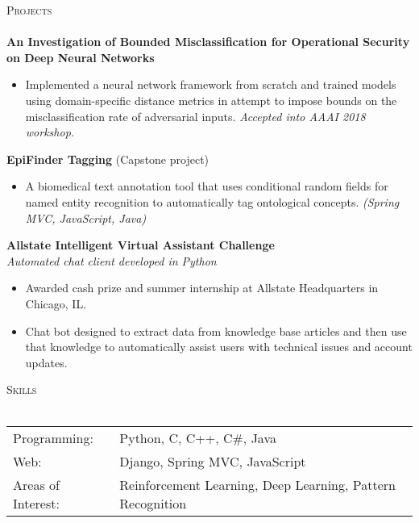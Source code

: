 \documentclass[a4paper]{article}
\newcommand{\lineunder} {
    \vspace*{-8pt} \\
    \hspace*{-18pt} \hrulefill \\
}
\newcommand{\header} [1] {
    {\hspace*{-18pt}\vspace*{6pt} \textsc{#1}}
    \vspace*{-6pt} \lineunder
}
\begin{document}
\header{Projects}
\textbf{An Investigation of Bounded Misclassification for Operational Security on Deep Neural Networks}
\begin{itemize}
	\item Implemented a neural network framework from scratch and trained models using domain-specific distance metrics in attempt to impose bounds on the misclassification rate of adversarial inputs. \textit{Accepted into AAAI 2018 workshop.}
\end{itemize}
\textbf{EpiFinder Tagging} (Capstone project) \\
\begin{itemize}
       \item A biomedical text annotation tool that uses conditional random fields for named entity recognition to automatically tag ontological concepts. \textit {(Spring MVC, JavaScript, Java) }\\
\end{itemize}

\textbf{Allstate Intelligent Virtual Assistant Challenge} \\
    \textit{Automated chat client developed in Python}
    \begin{itemize}
        \item Awarded cash prize and summer internship at Allstate Headquarters in Chicago, IL.
        \item Chat bot designed to extract data from knowledge base articles and then use that knowledge to automatically assist users with technical issues and account updates.
        \end{itemize}
\vspace*{2mm}

\header{Skills}
\begin{tabular}{ l l }
	Programming: & Python, C, C++, C\#, Java                                                                      \\
	Web:         & Django, Spring MVC, JavaScript                                                                 \\
    Areas of Interest: & Reinforcement Learning, Deep Learning, Pattern Recognition
\end{tabular}\\
\end{document}
